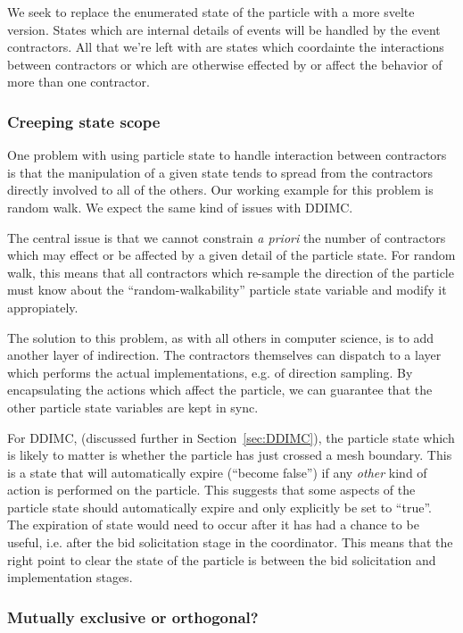 \documentclass[memo]{ResearchNote}
\begin{document}
We seek to replace the enumerated state of the particle with a more
svelte version. States which are internal details of events will be
handled by the event contractors. All that we're left with are states
which coordainte the interactions between contractors or which are
otherwise effected by or affect the behavior of more than one
contractor.

\subsubsection{Creeping state scope}

One problem with using particle state to handle interaction between
contractors is that the manipulation of a given state tends to spread
from the contractors directly involved to all of the others.  Our
working example for this problem is random walk. We expect the same
kind of issues with DDIMC.

The central issue is that we cannot constrain {\em a priori} the
number of contractors which may effect or be affected by a given
detail of the particle state. For random walk, this means that all
contractors which re-sample the direction of the particle must know
about the ``random-walkability'' particle state variable and modify it
appropiately.

The solution to this problem, as with all others in computer science,
is to add another layer of indirection. The contractors themselves can
dispatch to a layer which performs the actual implementations, e.g. of
direction sampling. By encapsulating the actions which affect the
particle, we can guarantee that the other particle state variables are
kept in sync.

For DDIMC, (discussed further in Section~\ref{sec:DDIMC}), the
particle state which is likely to matter is whether the particle has
just crossed a mesh boundary. This is a state that will automatically
expire (``become false'') if any {\em other} kind of action is
performed on the particle. This suggests that some aspects of the
particle state should automatically expire and only explicitly be set
to ``true''.  The expiration of state would need to occur after it has
had a chance to be useful, i.e. after the bid solicitation stage in
the coordinator. This means that the right point to clear the state of
the particle is between the bid solicitation and implementation
stages.

\subsubsection{Mutually exclusive or orthogonal?}
\end{document}
